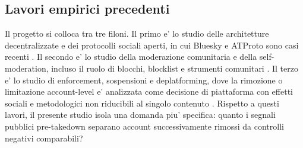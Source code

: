 \subsection{Lavori empirici precedenti}

Il progetto si colloca tra tre filoni. Il primo e' lo studio delle architetture decentralizzate e dei protocolli sociali aperti, in cui Bluesky e ATProto sono casi recenti \parencite{balduf2024looking}. Il secondo e' lo studio della moderazione comunitaria e della self-moderation, incluso il ruolo di blocchi, blocklist e strumenti comunitari \parencite{seering2020reconsidering, jhaver2018blocklists, bono2026selfmoderation, sokoto2026open}. Il terzo e' lo studio di enforcement, sospensioni e deplatforming, dove la rimozione o limitazione account-level e' analizzata come decisione di piattaforma con effetti sociali e metodologici non riducibili al singolo contenuto \parencite{gillespie2018custodians, west2018censored, jhaver2021deplatforming}. Rispetto a questi lavori, il presente studio isola una domanda piu' specifica: quanto i segnali pubblici pre-takedown separano account successivamente rimossi da controlli negativi comparabili?
